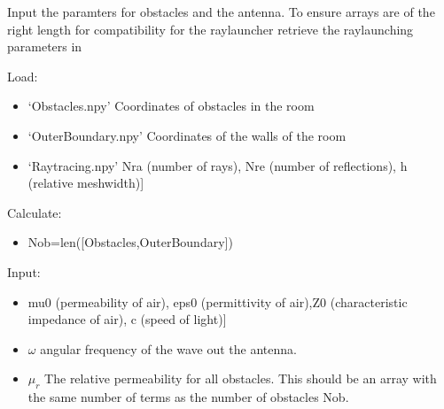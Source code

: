 \documentclass[letterpaper,10pt,english]{sphinxmanual}
\begin{document}

\begin{fulllineitems}
\label{\detokenize{index:ParameterInput.ObstacleCoefficients}}
Input the paramters for obstacles and the antenna. To ensure   arrays are of the right length for compatibility for the   ray\sphinxhyphen{}launcher retrieve the ray\sphinxhyphen{}launching parameters in   {\hyperref[\detokenize{index:ParameterInput.DeclareParameters}]{}}

Load:
\begin{itemize}
\item {} 
‘Obstacles.npy’     \sphinxhyphen{}Co\sphinxhyphen{}ordinates of obstacles in the room

\item {} 
‘OuterBoundary.npy’ \sphinxhyphen{} Co\sphinxhyphen{}ordinates of the walls of the room

\item {} 
‘Raytracing.npy’    \sphinxhyphen{}{[}Nra (number of rays), Nre (number of reflections),   h (relative meshwidth){]}

\end{itemize}

Calculate:
\begin{itemize}
\item {} 
Nob=len({[}Obstacles,OuterBoundary{]})

\end{itemize}

Input:
\begin{itemize}
\item {} 
 \sphinxhyphen{}{[}mu0 (permeability of air),   eps0 (permittivity of air),Z0 (characteristic impedance of air),   c (speed of light){]}

\item {} 
 \sphinxhyphen{} \(\omega\) angular frequency of the wave out   the antenna.

\item {} 
       \sphinxhyphen{} \(\mu_r\) The relative permeability for all obstacles.   This should be an array with the same number of terms as the number   of obstacles Nob.


\end{itemize}
\end{fulllineitems}
\end{document}
